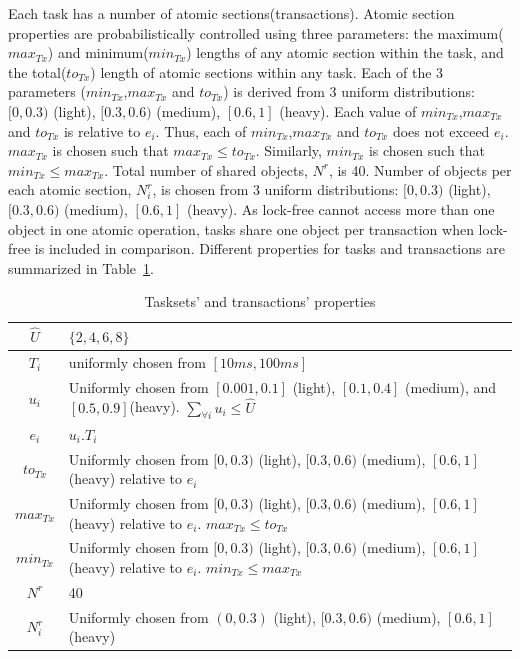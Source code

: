 Each task has a number of atomic sections(transactions). Atomic section properties are probabilistically controlled using three parameters: the maximum($max_{Tx}$) and minimum($min_{Tx}$) lengths of any atomic section within the task, and the total($to_{Tx}$) length of atomic sections within any task. Each of the 3 parameters ($min_{Tx}$,$max_{Tx}$ and $to_{Tx}$) is derived from 3 uniform distributions: $[0,0.3)$ (light), $[0.3,0.6)$ (medium), $[0.6,1]$ (heavy). Each value of $min_{Tx}$,$max_{Tx}$ and $to_{Tx}$ is relative to $e_i$. Thus, each of $min_{Tx}$,$max_{Tx}$ and $to_{Tx}$ does not exceed $e_i$. $max_{Tx}$ is chosen such that $max_{Tx} \le to_{Tx}$. Similarly, $min_{Tx}$ is chosen such that $min_{Tx} \le max_{Tx}$. Total number of shared objects, $N^r$, is 40. Number of objects per each atomic section, $N_i^r$, is chosen from 3 uniform distributions: $[0,0.3)$ (light), $[0.3,0.6)$ (medium), $[0.6,1]$ (heavy). As lock-free cannot access more than one object in one atomic operation, tasks share one object per transaction when lock-free is included in comparison. Different properties for tasks and transactions are summarized in Table~\ref{table:taskset_properties}.
%
\begin{flushleft}
\begin{table}[htbp]
\begin{centering}
\caption{\label{table:taskset_properties}Tasksets' and transactions' properties}
\begin{tabular}{|c|>{\raggedright}p{14cm}|}
\hline 
$\hat{U}$ & $\{2,4,6,8\}$\tabularnewline
\hline 
$T_{i}$ & uniformly chosen from $[10ms,100ms]$\tabularnewline
\hline 
$u_{i}$ & Uniformly chosen from $[0.001,0.1]$ (light), $[0.1,0.4]$ (medium),
and $[0.5,0.9]$(heavy). $\sum_{\forall i}u_{i}\le\hat{U}$\tabularnewline
\hline 
$e_{i}$ & $u_{i}.T_{i}$\tabularnewline
\hline 
$to_{Tx}$ & Uniformly chosen from $[0,0.3)$ (light), $[0.3,0.6)$ (medium), $[0.6,1]$
(heavy) relative to $e_{i}$\tabularnewline
\hline 
$max_{Tx}$ & Uniformly chosen from $[0,0.3)$ (light), $[0.3,0.6)$ (medium), $[0.6,1]$
(heavy) relative to $e_{i}$. $max_{Tx}\le to_{Tx}$\tabularnewline
\hline 
$min_{Tx}$ & Uniformly chosen from $[0,0.3)$ (light), $[0.3,0.6)$ (medium), $[0.6,1]$
(heavy) relative to $e_{i}$. $min_{Tx}\le max_{Tx}$\tabularnewline
\hline 
$N^{r}$ & 40\tabularnewline
\hline 
$N_{i}^{r}$ & Uniformly chosen from $(0,0.3)$ (light), $[0.3,0.6)$ (medium), $[0.6,1]$
(heavy)\tabularnewline
\hline 
\end{tabular}
\par\end{centering}
\end{table}
\par\end{flushleft}
%
